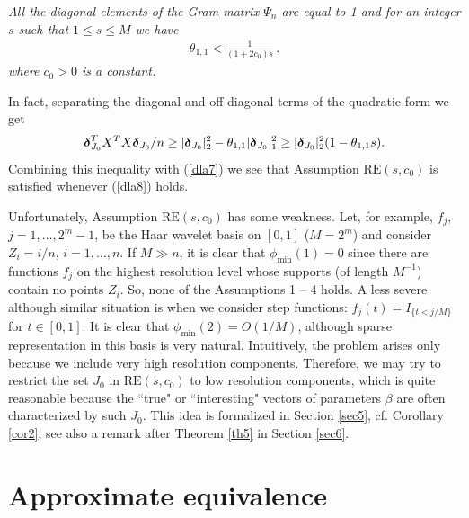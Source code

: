 \documentclass[dvips,aos]{imsart}
\numberwithin{equation}{section}
\theoremstyle{plain}
\def\RE#1#2{$\text{RE}(#1,#2)$}
\newcommand{\bD}{\mbox{\boldmath$\delta$}}
\begin{document}
 {\it All the diagonal elements of the
Gram matrix $\Psi_n$ are equal to 1 and for an integer $s$ such that
$1\le s \le M$ we have
\begin{equation}\begin{split}\label{dla8}
\theta_{1,1} < \frac{1}{ (1+2c_0)  s}\,.
\end{split}\end{equation}
where $c_0>0$ is a constant.}

In fact, separating the diagonal and off-diagonal terms of the
quadratic form we get
\begin{eqnarray*}
\bD_{J_0}^T X^T  X \bD_{J_{0}}/n \ge |\bD_{J_{0}}|_2^2 -
\theta_{1,1} |\bD_{J_{0}}|_1^2\ge |\bD_{J_{0}}|_2^2 (1 -
\theta_{1,1} s).
\end{eqnarray*}
Combining this inequality with (\ref{dla7}) we see that Assumption
\RE s{c_0} is satisfied whenever (\ref{dla8}) holds.

Unfortunately, Assumption \RE s{c_0} has some weakness. Let, for
example, $f_j$, $j=1,\dots,2^m-1$, be the Haar wavelet basis on
$[0,1]$ ($M=2^m$) and consider $Z_i=i/n$, $i=1,\dots,n$. If $M\gg
n$, it is clear that $\phi_{\min}(1)=0$ since there are functions
$f_j$ on the highest resolution level whose supports (of length
$M^{-1}$) contain no points $Z_i$. So, none of the Assumptions 1 --
4 holds. A less severe although similar situation is when we
consider step functions: $f_j(t)=I_{\{t<j/M\}}$ for $t\in[0,1]$. It
is clear that $\phi_{\min}(2)=O(1/M)$, although sparse
representation in this basis is very natural. Intuitively, the
problem arises only because we include very high resolution
components. Therefore, we may try to restrict the set $J_0$ in \RE
s{c_0} to low resolution components, which is quite reasonable
because the ``true" or ``interesting" vectors of parameters $\beta$
are often characterized by such $J_0$. This idea is formalized in
Section \ref{sec5}, cf. Corollary \ref{cor2}, see also a remark
after Theorem \ref{th5} in Section \ref{sec6}.








\section{Approximate equivalence}
\label{sec3}
\end{document}
